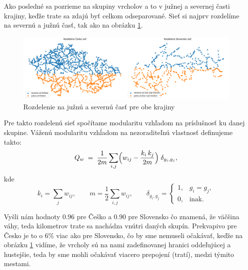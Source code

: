 \documentclass[main.tex]{subfiles}
\begin{document}
Ako posledné sa pozrieme na skupiny vrcholov a to v južnej a severnej časti krajiny, keďže trate sa zdajú byť celkom odseparované. Sieť si najprv rozdelíme na severnú a južnú časť, tak ako na obrázku \ref{obr:split}.

\begin{figure}
    \centerline{\includegraphics[width=1.2\textwidth]{images/south_north_split.png}}
    \caption{Rozdelenie na južnú a severnú časť pre obe krajiny}
    \label{obr:split}
\end{figure}

Pre takto rozdelenú sieť spočítame modularitu vzhľadom na príslušnosť ku danej skupine. Váženú modularitu vzhĺadom na nezoraditeľnú vlastnosť definujeme takto: 
 \[
Q_w \;=\;
\frac{1}{2m}
\sum_{i,j}
\Bigl(
  w_{ij}
  - \frac{k_i\,k_j}{2m}
\Bigr)
\;\delta_{g_i,g_j},
\]
kde
\[
k_i = \sum_j w_{ij},
\qquad
m = \frac{1}{2}\sum_{i,j}w_{ij},
\qquad
\delta_{g_i,g_j} =
\begin{cases}
1, & g_i = g_j,\\
0, & \text{inak.}
\end{cases}
\]

Vyšli nám hodnoty $0.96$ pre Češko a $0.90$ pre Slovensko čo znamená, že väčšina váhy, teda kilometrov trate sa nachádza vnútri daných skupín. Prekvapivo pre Česko je to o $6\%$ viac ako pre Slovensko, čo by sme nemuseli očakávať, keďže na obrázku \ref{obr:split} vidíme, že vrcholy sú na nami zadefinovanej hranici oddeľujúcej  a  hustejšie, teda by sme mohli očakávať viacero prepojení (tratí), medzi týmito mestami.
\end{document}
